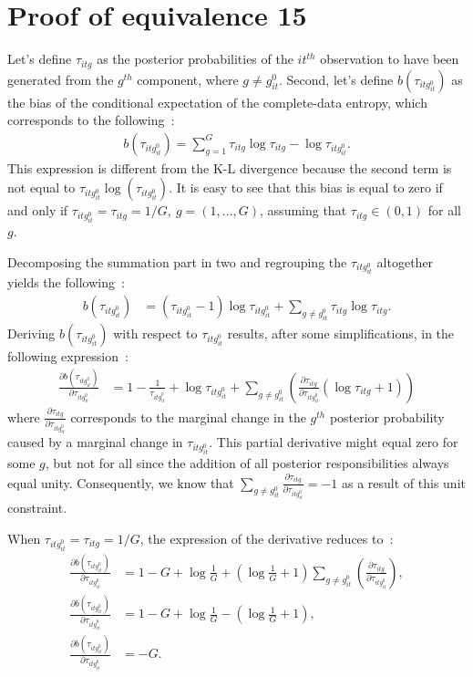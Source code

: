 \documentclass[11pt,letter]{article}
\begin{document}
\section{Proof of equivalence 15}
Let's define $\tau_{itg}$ as the posterior probabilities of the $it^{th}$ observation to have been generated from the $g^{th}$ component, where $g \ne g^0_{it}$. Second, let's define $b(\tau_{itg^{0}_{it}})$ as the bias of the conditional expectation of the complete-data entropy, which corresponds to the following~:
\begin{align*}
b(\tau_{itg^{0}_{it}}) = \sum_{g=1}^G \tau_{itg} \log \tau_{itg} - \log \tau_{itg^{0}_{it}}.
\end{align*}
This expression is different from the K-L divergence because the second term is not equal to $\tau_{itg^{0}_{it}}\log (\tau_{itg^{0}_{it}})$. It is easy to see that this bias is equal to zero if and only if $\tau_{itg^{0}_{it}} = \tau_{itg} = 1/G, \ g = (1,...,G)$, assuming that $\tau_{itg} \in (0,1)$ for all $g$.
\par
Decomposing the summation part in two and regrouping the $\tau_{itg^{0}_{it}}$ altogether yields the following~:
\begin{align*}
b(\tau_{itg^{0}_{it}}) &= (\tau_{itg^{0}_{it}}-1)\log \tau_{itg^{0}_{it}} + \sum_{g\ne g^0_{it}} \tau_{itg} \log \tau_{itg}.
\end{align*}
 Deriving $b(\tau_{itg^{0}_{it}})$ with respect to $\tau_{itg^{0}_{it}}$ results, after some simplifications, in the following expression~:
\begin{align*}
\frac{\partial b(\tau_{itg^{0}_{it}})}{\partial \tau_{itg^0_{it}}} &= 1 - \frac{1}{\tau_{itg^{0}_{it}}} + \log \tau_{itg^{0}_{it}} + \sum_{g\ne g^0_{it}} \left( \frac{\partial \tau_{itg}}{\partial \tau_{itg^{0}_{it}}}  (\log\tau_{itg}+ 1)\right)
\end{align*}
where $\frac{\partial \tau_{itg}}{\partial \tau_{itg^{0}_{it}}}$ corresponds to the marginal change in the $g^{th}$ posterior probability caused by a marginal change in $\tau_{itg^{0}_{it}}$. This partial derivative might equal zero for some $g$, but not for all since the addition of all posterior responsibilities always equal unity. Consequently, we know that $\sum_{g\ne g^0_{it}} \frac{\partial \tau_{itg}}{\partial \tau_{itg^{0}_{it}}} = -1$ as a result of this unit constraint. 
\par
When $\tau_{itg^{0}_{it}} = \tau_{itg} = 1/G$, the expression of the derivative reduces to~:
\begin{align*}
\frac{\partial b(\tau_{itg^{0}_{it}})}{\partial \tau_{itg^0_{it}}} &= 1 - G + \log \frac{1}{G} + (\log \frac{1}{G} + 1)\sum_{g\ne g^0_{it}} \left( \frac{\partial \tau_{itg}}{\partial \tau_{itg^{0}_{it}}}  \right),\\
\frac{\partial b(\tau_{itg^{0}_{it}})}{\partial \tau_{itg^0_{it}}} &= 1 - G + \log \frac{1}{G} - (\log \frac{1}{G} + 1),\\
\frac{\partial b(\tau_{itg^{0}_{it}})}{\partial \tau_{itg^0_{it}}} &= -G.
\end{align*}
\end{document}
